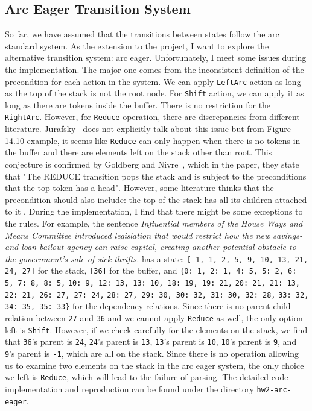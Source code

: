 \documentclass[11pt,a4paper]{article}
\begin{document}
\subsection{Arc Eager Transition System}

So far, we have assumed that the transitions between states follow the arc standard system. As the extension
to the project, I want to explore the alternative transition system: arc eager. Unfortunately, I meet some
issues during the implementation. The major one comes from the inconsistent
definition of the precondtion for each action in the system. We can apply \verb|LeftArc| action as long as the top
of the stack is not the root node. For \verb|Shift| action, we can apply it as long as there are tokens inside the buffer.
There is no restriction for the \verb|RightArc|. However, for \verb|Reduce| operation, there are
discrepancies from different literature. Jurafsky~ does not explicitly talk about this issue
but from Figure 14.10 example, it seems like \verb|Reduce| can only happen when there is no tokens in the buffer and
there are elements left on the stack other than root. This conjecture is confirmed by Goldberg and Nivre~,
which in the paper, they state that "The REDUCE transition pops the stack and is subject to the preconditions that the top
token has a head". However, some literature thinks that the precondition should also include: the top of the stack has all its
children attached to it \cite{cmuarc}. During the implementation, I find that there might be some exceptions to the rules. For example, 
the sentence \emph{Influential members of the House Ways and Means Committee introduced legislation that would restrict
how the new savings-and-loan bailout agency can raise capital, creating another potential obstacle to the government's sale of sick
thrifts.} has a state: \verb|[-1, 1, 2, 5, 9, 10, 13, 21, 24, 27]| for the stack,
\verb|[36]| for the buffer, and \verb|{0: 1, 2: 1, 4: 5, 5: 2, 6: 5, 7: 8, 8: 5,|
\verb|10: 9, 12: 13, 13: 10, 18: 19, 19: 21,| 
\verb|20: 21, 21: 13, 22: 21, 26: 27, 27: 24,|
\verb|28: 27, 29: 30, 30: 32, 31: 30, 32: 28,|
\verb|33: 32, 34: 35, 35: 33}| for the dependency relations. 
Since there is no parent-child relation between \verb|27| and \verb|36| and we cannot apply \verb|Reduce|
as well, the only option left is \verb|Shift|. However, if we check carefully for the elements on the stack, we find that
\verb|36|'s parent is \verb|24|, \verb|24|'s parent is \verb|13|, \verb|13|'s parent is \verb|10|, \verb|10|'s parent is \verb|9|, and 
\verb|9|'s parent is \verb|-1|, which are all on the stack. Since there is no operation allowing us to examine two elements on the stack in 
the arc eager system, the only choice we left is 
\verb|Reduce|, which will lead to the failure of parsing. The detailed code implementation and reproduction can be found under the directory
\verb|hw2-arc-eager|.
\end{document}
